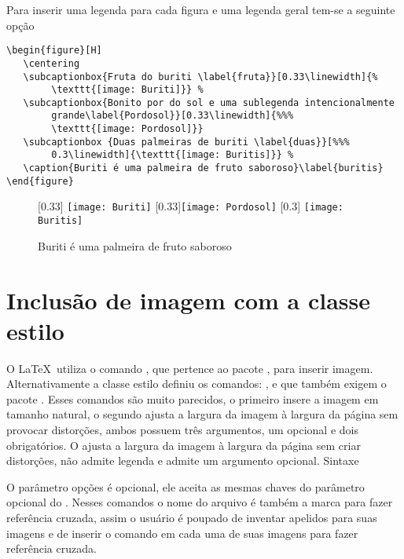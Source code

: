 Para inserir uma legenda para cada figura e uma legenda geral tem-se a seguinte opção
\begin{tcolorbox}
\begin{lstlisting}
\begin{figure}[H]
   \centering
   \subcaptionbox{Fruta do buriti \label{fruta}}[0.33\linewidth]{%
		\texttt{[image: Buriti]}} %
   \subcaptionbox{Bonito por do sol e uma sublegenda intencionalmente
        grande\label{Pordosol}}[0.33\linewidth]{%%%
        \texttt{[image: Pordosol]}}
   \subcaptionbox {Duas palmeiras de buriti \label{duas}}[%%%
        0.3\linewidth]{\texttt{[image: Buritis]}} %
   \caption{Buriti é uma palmeira de fruto saboroso}\label{buritis}
\end{figure}
\end{lstlisting}
\end{tcolorbox}

\begin{figure}[H]
	\centering
	[0.33\linewidth]{%
		\texttt{[image: Buriti]}} %
	[0.33\linewidth]{\texttt{[image: Pordosol]}}
	[0.3\linewidth]{%
		\texttt{[image: Buritis]}} %
	\caption{Buriti é uma palmeira de fruto saboroso}\label{buritis}
\end{figure}


\section{Inclusão de imagem com a classe estilo}

O \LaTeX\ utiliza o comando , que pertence ao pacote , para inserir imagem. Alternativamente a classe estilo definiu os comandos: ,
 e  que também exigem o pacote . Esses comandos são muito parecidos, o primeiro insere a imagem em tamanho natural, o segundo ajusta a largura da imagem à largura da página sem provocar distorções, ambos possuem três argumentos, um opcional e dois obrigatórios. O   ajusta a largura da imagem à largura da página sem criar distorções, não admite legenda e admite um argumento opcional. Sintaxe

\begin{center}
	
	
\end{center}
O parâmetro opções é opcional, ele aceita as mesmas chaves do 
parâmetro opcional do . Nesses comandos o 
nome do arquivo é também a marca para fazer referência cruzada, 
assim o usuário é poupado de inventar apelidos para suas imagens 
e de inserir o comando  em cada uma de suas 
imagens para fazer referência cruzada.

